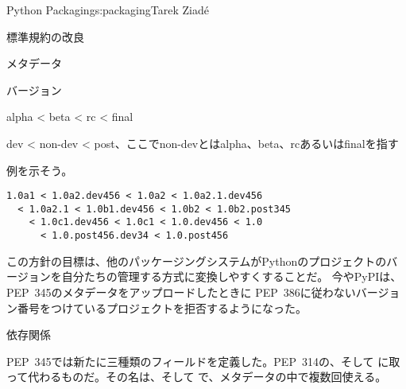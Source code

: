 \begin{aosachapter}{Python Packaging}{s:packaging}{Tarek Ziad\'{e}}
\begin{aosasect1}{標準規約の改良}
\begin{aosasect2}{メタデータ}
\begin{aosasect3}{バージョン}
\begin{aosaitemize}

  \item alpha {\textless} beta {\textless} rc {\textless} final

  \item dev {\textless} non-dev {\textless} post、ここでnon-devとはalpha、beta、rcあるいはfinalを指す

\end{aosaitemize}

\noindent
例を示そう。

\begin{verbatim}
1.0a1 < 1.0a2.dev456 < 1.0a2 < 1.0a2.1.dev456
  < 1.0a2.1 < 1.0b1.dev456 < 1.0b2 < 1.0b2.post345
    < 1.0c1.dev456 < 1.0c1 < 1.0.dev456 < 1.0
      < 1.0.post456.dev34 < 1.0.post456
\end{verbatim}

\noindent
この方針の目標は、他のパッケージングシステムがPythonのプロジェクトのバージョンを自分たちの管理する方式に変換しやすくすることだ。
今やPyPIは、PEP~345のメタデータをアップロードしたときに
PEP~386に従わないバージョン番号をつけているプロジェクトを拒否するようになった。

\end{aosasect3}

\begin{aosasect3}{依存関係}

PEP~345では新たに三種類のフィールドを定義した。PEP~314の、そして
に取って代わるものだ。その名は、そして
で、メタデータの中で複数回使える。


\end{aosasect3}
\end{aosasect2}
\end{aosasect1}
\end{aosachapter}
